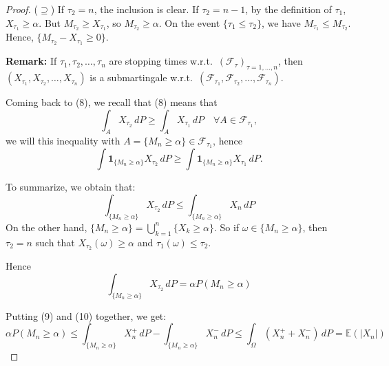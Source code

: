 \begin{proof}
($\supseteq$) If $\tau_2 = n$, the inclusion is clear.
If $\tau_2 = n-1$, by the definition of $\tau_1$, $X_{\tau_1} \geq \alpha$. But $M_{\tau_2} \geq X_{\tau_1}$, so $M_{\tau_2} \geq \alpha$.
On the event $\{\tau_1 \leq \tau_2\}$, we have $M_{\tau_1} \leq M_{\tau_2}$.
Hence, $\{M_{\tau_2} - X_{\tau_1} \geq 0\}$.

\textbf{Remark:}
If $\tau_1, \tau_2, \ldots, \tau_n$ are stopping times w.r.t.\ $(\mathcal{F}_{\tau})_{\tau=1,\ldots,n}$, then $(X_{\tau_1}, X_{\tau_2}, \ldots, X_{\tau_n})$ is a submartingale w.r.t.\ $(\mathcal{F}_{\tau_1}, \mathcal{F}_{\tau_2}, \ldots, \mathcal{F}_{\tau_n})$.

Coming back to (8), we recall that (8) means that
\[
\int_A X_{\tau_2} \, dP \geq \int_A X_{\tau_1} \, dP \quad \forall A \in \mathcal{F}_{\tau_1},
\]
we will this inequality with $A = \{M_n \geq \alpha\} \in \mathcal{F}_{\tau_1}$, hence
\[
\int \mathbf{1}_{\{M_n \geq \alpha\}} X_{\tau_2} \, dP \geq \int \mathbf{1}_{\{M_n \geq \alpha\}} X_{\tau_1} \, dP.
\]

To summarize, we obtain that:
\[
\int_{\{M_n \geq \alpha\}} X_{\tau_2} \, dP \leq \int_{\{M_n \geq \alpha\}} X_n \, dP \tag{9}
\]
On the other hand, $\{M_n \geq \alpha\} = \bigcup_{k=1}^n \{X_k \geq \alpha\}$. So if $\omega \in \{M_n \geq \alpha\}$, then $\tau_2 = n$ such that $X_{\tau_2}(\omega) \geq \alpha$ and $\tau_1(\omega) \leq \tau_2$.

Hence
\[
\int_{\{M_n \geq \alpha\}} X_{\tau_2} \, dP = \alpha P(M_n \geq \alpha) \tag{10}
\]

Putting (9) and (10) together, we get:
\[
\alpha P(M_n \geq \alpha) \leq \int_{\{M_n \geq \alpha\}} X_n^+ \, dP - \int_{\{M_n \geq \alpha\}} X_n^- \, dP \leq \int_{\Omega} (X_n^+ + X_n^-) \, dP = \mathbb{E}(|X_n|)
\]

\end{proof}

